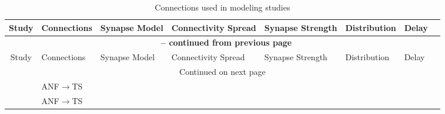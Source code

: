 


\begin{longtable}{cXXXXXXX}%
%
\caption{Connections  used in modeling studies} \\
\toprule  
                     Study                       &           Connections           &                                                   Synapse Model                                                    &                    Connectivity Spread                    &             Synapse Strength              &                                  Distribution                                   & Delay \\ \midrule
\endfirsthead

\multicolumn{8}{c}{{\bfseries \tablename\ \thetable{} -- continued from previous page}} \\
                \midrule  Study                  &           Connections           &                                                   Synapse Model                                                    &                    Connectivity Spread                    &             Synapse Strength              &                                  Distribution                                   & Delay \\ \midrule
\endhead

\midrule \multicolumn{8}{c}{{Continued on next page}} \\ %
\endfoot
\bottomrule
\endlastfoot

             \citep{WangSachs:1995}              &  ANF\ensuremath{\rightarrow}TS  &                                                                                                                    &                                                           &                                           &                                                                                 &                                           & \\
\citep{LaiWinslowEtAl:1994,LaiWinslowEtAl:1994a} &  ANF\ensuremath{\rightarrow}TS  &                                                                                                                    &                                                           &                                           &                                                                                 &                                           & \\ \midrule



\end{longtable}
